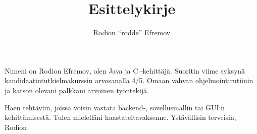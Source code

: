 \documentclass[10pt]{article}
\title{Esittelykirje}
\author{Rodion ``rodde'' Efremov}
\begin{document}
 \maketitle

\noindent Nimeni on Rodion Efremov, olen Java ja C -kehittäjä. Suoritin viime syksynä kandidaatintutkielmakurssin arvosanalla 4/5. Omaan vahvan ohjelmointirutiinin ja katson olevani palkkani arvoinen työntekijä.

Haen tehtäviin, joissa voisin vastata backend-, sovellusmallin tai GUI:n kehittämisestä. Tulen mielelläni haastateltavaksenne.
\newline \break
Ystävällisin terveisin, Rodion
\end{document}
